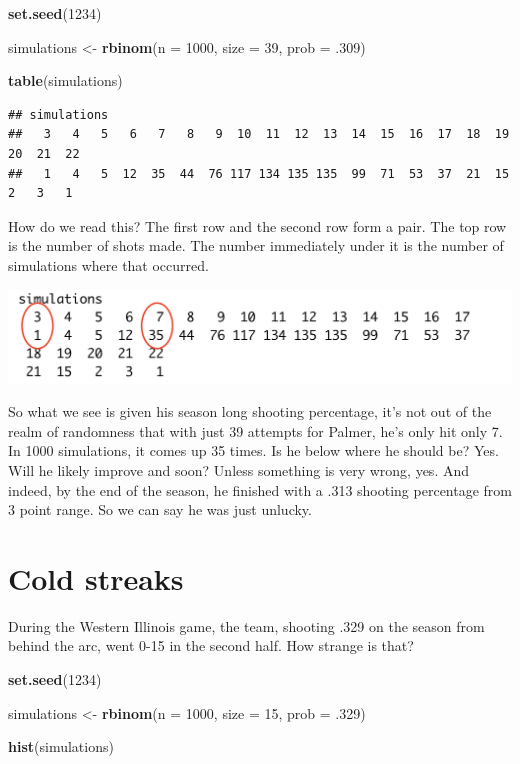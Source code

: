 \documentclass[]{book}
\newenvironment{Shaded}{\begin{snugshade}}{\end{snugshade}}
\newcommand{\DataTypeTok}[1]{\textcolor[rgb]{0.13,0.29,0.53}{#1}}
\newcommand{\DecValTok}[1]{\textcolor[rgb]{0.00,0.00,0.81}{#1}}
\newcommand{\FloatTok}[1]{\textcolor[rgb]{0.00,0.00,0.81}{#1}}
\newcommand{\KeywordTok}[1]{\textcolor[rgb]{0.13,0.29,0.53}{\textbf{#1}}}
\newcommand{\NormalTok}[1]{#1}
\newcommand{\StringTok}[1]{\textcolor[rgb]{0.31,0.60,0.02}{#1}}
\begin{document}
\begin{Shaded}
\begin{Highlighting}[]
\KeywordTok{set.seed}\NormalTok{(}\DecValTok{1234}\NormalTok{)}

\NormalTok{simulations <-}\StringTok{ }\KeywordTok{rbinom}\NormalTok{(}\DataTypeTok{n =} \DecValTok{1000}\NormalTok{, }\DataTypeTok{size =} \DecValTok{39}\NormalTok{, }\DataTypeTok{prob =} \FloatTok{.309}\NormalTok{)}

\KeywordTok{table}\NormalTok{(simulations)}
\end{Highlighting}
\end{Shaded}

\begin{verbatim}
## simulations
##   3   4   5   6   7   8   9  10  11  12  13  14  15  16  17  18  19  20  21  22 
##   1   4   5  12  35  44  76 117 134 135 135  99  71  53  37  21  15   2   3   1
\end{verbatim}

How do we read this? The first row and the second row form a pair. The top row is the number of shots made. The number immediately under it is the number of simulations where that occurred.

\includegraphics[width=23.06in]{images/simulations1}

So what we see is given his season long shooting percentage, it's not out of the realm of randomness that with just 39 attempts for Palmer, he's only hit only 7. In 1000 simulations, it comes up 35 times. Is he below where he should be? Yes. Will he likely improve and soon? Unless something is very wrong, yes. And indeed, by the end of the season, he finished with a .313 shooting percentage from 3 point range. So we can say he was just unlucky.

\hypertarget{cold-streaks}{%
\section{Cold streaks}\label{cold-streaks}}

During the Western Illinois game, the team, shooting .329 on the season from behind the arc, went 0-15 in the second half. How strange is that?

\begin{Shaded}
\begin{Highlighting}[]
\KeywordTok{set.seed}\NormalTok{(}\DecValTok{1234}\NormalTok{)}

\NormalTok{simulations <-}\StringTok{ }\KeywordTok{rbinom}\NormalTok{(}\DataTypeTok{n =} \DecValTok{1000}\NormalTok{, }\DataTypeTok{size =} \DecValTok{15}\NormalTok{, }\DataTypeTok{prob =} \FloatTok{.329}\NormalTok{)}

\KeywordTok{hist}\NormalTok{(simulations)}
\end{Highlighting}
\end{Shaded}
\end{document}
